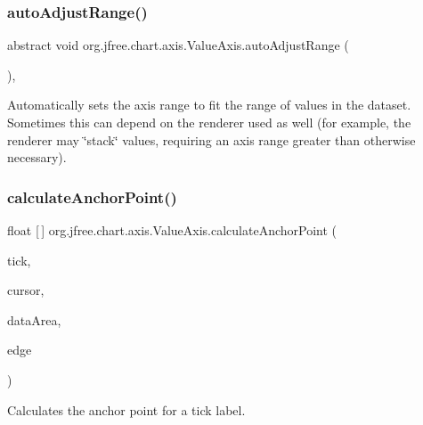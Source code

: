 \subsubsection{\texorpdfstring{auto\+Adjust\+Range()}{autoAdjustRange()}}
{\footnotesize\ttfamily abstract void org.\+jfree.\+chart.\+axis.\+Value\+Axis.\+auto\+Adjust\+Range (\begin{DoxyParamCaption}{ }\end{DoxyParamCaption})\hspace{0.3cm}{\ttfamily [abstract]}, {\ttfamily [protected]}}

Automatically sets the axis range to fit the range of values in the dataset. Sometimes this can depend on the renderer used as well (for example, the renderer may \char`\"{}stack\char`\"{} values, requiring an axis range greater than otherwise necessary). \mbox{\label{classorg_1_1jfree_1_1chart_1_1axis_1_1_value_axis_a84f34702efc34e2108d4c0366d8e8f94}} 
\subsubsection{\texorpdfstring{calculate\+Anchor\+Point()}{calculateAnchorPoint()}}
{\footnotesize\ttfamily float \mbox{[}$\,$\mbox{]} org.\+jfree.\+chart.\+axis.\+Value\+Axis.\+calculate\+Anchor\+Point (\begin{DoxyParamCaption}\item[{\mbox{\hyperlink{classorg_1_1jfree_1_1chart_1_1axis_1_1_value_tick}{Value\+Tick}}}]{tick,  }\item[{double}]{cursor,  }\item[{Rectangle2D}]{data\+Area,  }\item[{Rectangle\+Edge}]{edge }\end{DoxyParamCaption})\hspace{0.3cm}{\ttfamily [protected]}}

Calculates the anchor point for a tick label.


